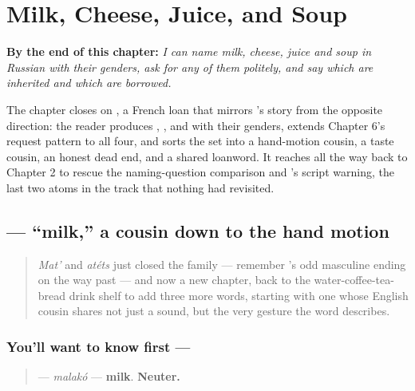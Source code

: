 
\chapter{Milk, Cheese, Juice, and Soup}
\label{ch:russian-milk-cheese-juice-soup}

\begin{chapteropening}
\textbf{By the end of this chapter:} \emph{I can name milk, cheese, juice and soup in Russian with their genders, ask for any of them politely, and say which are inherited and which are borrowed.}

The chapter closes on , a French loan that mirrors 's story from the opposite direction: the reader produces , ,  and  with their genders, extends Chapter 6's request pattern to all four, and sorts the set into a hand-motion cousin, a taste cousin, an honest dead end, and a shared loanword. It reaches all the way back to Chapter 2 to rescue the naming-question comparison and 's script warning, the last two atoms in the track that nothing had revisited.
\end{chapteropening}

\section[\texorpdfstring{\ru{молоко} (malakó)}{молоко (malakó)}]{ — \textquotedblleft{}milk,\textquotedblright{} a cousin down to the hand motion}

\label{lesson:RU-C13-moloko}



\begin{quote}
\emph{Mat'} and \emph{atéts} just closed the family — remember \emph{}'s odd masculine ending on the way past — and now a new chapter, back to the water-coffee-tea-bread drink shelf to add three more words, starting with one whose English cousin shares not just a sound, but the very gesture the word describes.
\end{quote}

\subsection*{You'll want to know first — }
\begin{quote}
\textbf{} — \emph{malakó} — \textbf{milk}. \textbf{Neuter.}
\end{quote}

